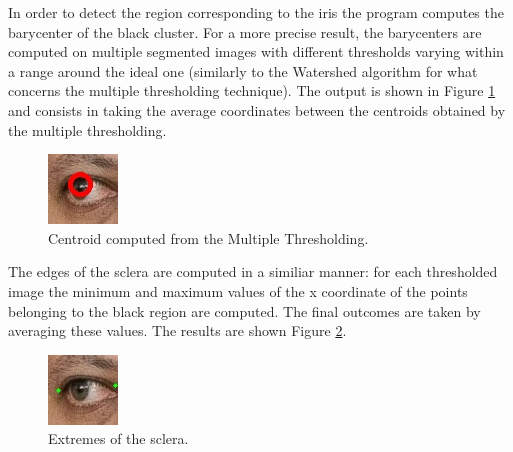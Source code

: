 \documentclass[14pt,a4paper]{extreport}
\begin{document}
In order to detect the region corresponding to the iris the program computes the barycenter of the black cluster. For a more precise result, the barycenters are computed on multiple segmented images with different thresholds varying within a range around the ideal one (similarly to the Watershed algorithm for what concerns the multiple thresholding technique). The output is shown in Figure \ref{fig:centr} and consists in taking the average coordinates between the centroids obtained by the multiple thresholding.

\begin{figure}[h]
\includegraphics[width=0.5\linewidth, center]{images_T2S/5_centroid0.jpg} 
\caption{Centroid computed from the Multiple Thresholding.}
\label{fig:centr}
\end{figure}

The edges of the sclera are computed in a similiar manner: for each thresholded image the minimum and maximum values of the x coordinate of the points belonging to the black region are computed. The final outcomes are taken by averaging these values. The results are shown Figure \ref{fig:extr}.

\begin{figure}[h]
\includegraphics[width=0.5\linewidth, center]{images_T2S/5_extr0.jpg} 
\caption{Extremes of the sclera.}
\label{fig:extr}
\end{figure}
\end{document}
